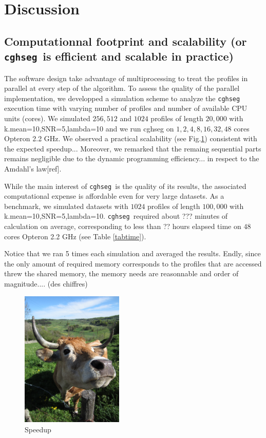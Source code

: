 \documentclass[article,10pt]{llncs}
\newcommand{\esoft}{\texttt{cghseg }}
\begin{document}
\section{Discussion}
\subsection{Computationnal footprint and scalability (or \esoft is efficient and scalable in practice)}

The software design take advantage of multiprocessing to treat the profiles in parallel at every step of the algorithm.
To assess the quality of the parallel implementation, we developped a simulation scheme to analyze the \esoft execution time 
with varying number of profiles and number of available CPU units (cores).
We simulated $256, 512$ and $1024$ profiles of length $20,000$ with k.mean=10,SNR=5,lambda=10 and we run cghseg on $1,2,4,8,16,32,48$ cores Opteron 2.2 GHz.
We observed a practical scalability (see Fig.\ref{figspeedup}) consistent with the expected speedup...
Moreover, we remarked that the remaing sequential parts remains negligible due to the dynamic programming efficiency... in respect to the Amdahl's law[ref].

While the main interest of \esoft is the quality of its results, the associated computational expense is affordable even
for very large datasets. As a benchmark, we simulated datasets with $1024$ profiles of length $100,000$ with k.mean=10,SNR=5,lambda=10. 
\esoft required about ??? minutes of calculation on average, corresponding to less than ?? hours elapsed time on $48$ cores Opteron 2.2 GHz (see Table \ref{tabtime}).

Notice that we ran 5 times each simulation and averaged the results. 
Endly, since the only amount of required memory corresponds to the profiles that are accessed threw the shared memory, the memory needs are reasonnable and order of magnitude....  (des chiffres)

\begin{figure}[h!]
  \begin{center}
    \includegraphics[height=6.5cm]{figures/speedup}
    \caption{Speedup}
    \label{figspeedup}
  \end{center}
\end{figure}
\end{document}
